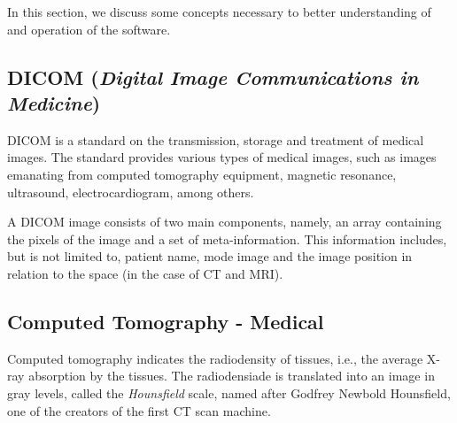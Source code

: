 In this section, we discuss some concepts necessary to better understanding of and operation of the software.

\subsection{DICOM (\textit{Digital Image Communications in Medicine})}			

DICOM is a standard on the transmission, storage and treatment of medical images. The standard provides various types of medical images, such as images emanating from computed tomography equipment, magnetic resonance, ultrasound, electrocardiogram, among others.


A DICOM image consists of two main components, namely, an array containing the pixels of the image and a set of meta-information. This information includes, but is not limited to, patient name, mode image and the image position in relation to the space (in the case of CT and MRI).

\subsection{Computed Tomography - Medical}

Computed tomography indicates the radiodensity of tissues, i.e., the average X-ray absorption by the tissues. The radiodensiade is translated into an image in gray levels, called the \textit{Hounsfield} scale, named after Godfrey Newbold Hounsfield, one of the creators of the first CT scan machine.

